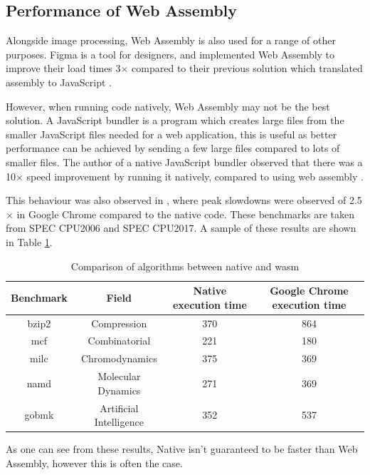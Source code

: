 \documentclass[12pt,a4paper]{article}
\begin{document}
\subsection{Performance of Web Assembly}

Alongside image processing, Web Assembly is also used for a range of other purposes. Figma is a tool for designers, and implemented Web Assembly to improve their load times 3$\times$ compared to their previous solution which translated assembly to JavaScript \cite{figmawasm}.


However, when running code natively, Web Assembly may not be the best solution. A JavaScript bundler is a program which creates large files from the smaller JavaScript files needed for a web application, this is useful as better performance can be achieved by sending a few large files compared to lots of smaller files. The author of a native JavaScript bundler observed that there was a 10$\times$ speed improvement by running it natively, compared to using web assembly \cite{esbuild}.

This behaviour was also observed in \cite{jangda2019not}, where peak slowdowns were observed of 2.5$\times$ in Google Chrome compared to the native code. These benchmarks are taken from SPEC CPU2006 and SPEC CPU2017. A sample of these results are shown in Table \ref{native}.
\begin{table}[H]
    \centering
    \caption{Comparison of algorithms between native and wasm}
    \vspace*{6pt}
    \label{native}
    \begin{tabular}{cccc}\hline\hline
        Benchmark & Field                   & Native execution time & Google Chrome execution time \\ \hline
        bzip2     & Compression             & 370                   & 864                          \\
        mcf       & Combinatorial           & 221                   & 180                          \\
        milc      & Chromodynamics          & 375                   & 369                          \\
        namd      & Molecular Dynamics      & 271                   & 369                          \\
        gobmk     & Artificial Intelligence & 352                   & 537
    \end{tabular}
\end{table}

As one can see from these results, Native isn't guaranteed to be faster than Web Assembly, however this is often the case.
\end{document}
